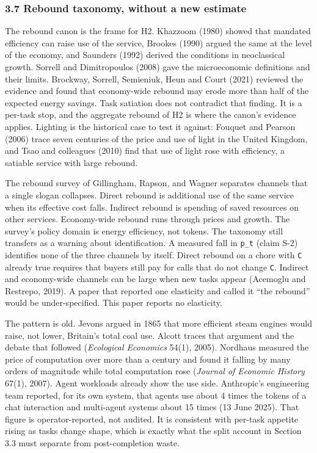 \documentclass[
  10pt,
]{article}
\newcounter{none} %
\begin{document}
\subsubsection{3.7 Rebound taxonomy, without a new
estimate}\label{rebound-taxonomy-without-a-new-estimate}

The rebound canon is the frame for H2. Khazzoom (1980) showed that
mandated efficiency can raise use of the service, Brookes (1990) argued
the same at the level of the economy, and Saunders (1992) derived the
conditions in neoclassical growth. Sorrell and Dimitropoulos (2008) gave
the microeconomic definitions and their limits. Brockway, Sorrell,
Semieniuk, Heun and Court (2021) reviewed the evidence and found that
economy-wide rebound may erode more than half of the expected energy
savings. Task satiation does not contradict that finding. It is a
per-task stop, and the aggregate rebound of H2 is where the canon's
evidence applies. Lighting is the historical case to test it against:
Fouquet and Pearson (2006) trace seven centuries of the price and use of
light in the United Kingdom, and Tsao and colleagues (2010) find that
use of light rose with efficiency, a satiable service with large
rebound.

The rebound survey of Gillingham, Rapson, and Wagner separates channels
that a single slogan collapses. Direct rebound is additional use of the
same service when its effective cost falls. Indirect rebound is spending
of saved resources on other services. Economy-wide rebound runs through
prices and growth. The survey's policy domain is energy efficiency, not
tokens. The taxonomy still transfers as a warning about identification.
A measured fall in \texttt{p\_t} (claim S-2) identifies none of the
three channels by itself. Direct rebound on a chore with \texttt{C}
already true requires that buyers still pay for calls that do not change
\texttt{C}. Indirect and economy-wide channels can be large when new
tasks appear (Acemoglu and Restrepo, 2019). A paper that reported one
elasticity and called it ``the rebound'' would be under-specified. This
paper reports no elasticity.

The pattern is old. Jevons argued in 1865 that more efficient steam
engines would raise, not lower, Britain's total coal use. Alcott traces
that argument and the debate that followed (\emph{Ecological Economics}
54(1), 2005). Nordhaus measured the price of computation over more than
a century and found it falling by many orders of magnitude while total
computation rose (\emph{Journal of Economic History} 67(1), 2007). Agent
workloads already show the use side. Anthropic's engineering team
reported, for its own system, that agents use about 4 times the tokens
of a chat interaction and multi-agent systems about 15 times (13 June
2025). That figure is operator-reported, not audited. It is consistent
with per-task appetite rising as tasks change shape, which is exactly
what the split account in Section 3.3 must separate from post-completion
waste.
\end{document}
